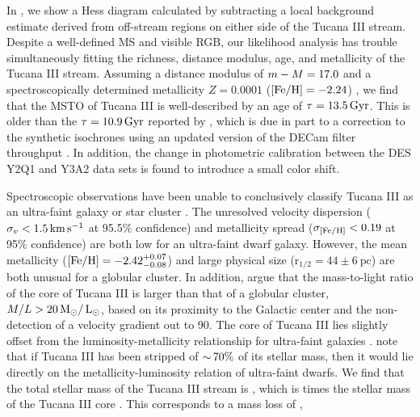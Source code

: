 \documentclass[twocolumn]{aastex61}
\begin{document}
In , we show a Hess diagram calculated by subtracting a local background estimate derived from off-stream regions on either side of the Tucana III stream.
Despite a well-defined MS and visible RGB, our likelihood analysis has trouble simultaneously fitting the richness, distance modulus, age, and metallicity of the Tucana III stream.
Assuming a distance modulus of $m - M = 17.0$ \citep{Drlica-Wagner:2015} and a spectroscopically determined metallicity  $Z = 0.0001$ (${\rm [Fe/H]} = -2.24$) \citep{Simon:2017}, we find that the MSTO of Tucana III is well-described by an age of ${\tau} = 13.5\mathrm{\,Gyr}$. 
This is older than the $\tau = 10.9\mathrm{\,Gyr}$ reported by \citet{Drlica-Wagner:2015}, which is due in part to a correction to the synthetic isochrones using an updated version of the DECam filter throughput \citep{Li:2018}.
In addition, the change in photometric calibration between the DES Y2Q1 and Y3A2 data sets is found to introduce a small color shift.

Spectroscopic observations have been unable to conclusively classify Tucana III as an ultra-faint galaxy or star cluster \citep{Simon:2017}. 
The unresolved velocity dispersion ($\sigma_v < 1.5 \mathrm{\,km} \mathrm{\,s}^{-1}$ at 95.5\% confidence) and metallicity spread ($\sigma_{{\rm [Fe/H]}} < 0.19$ at 95\% confidence) are both low for an ultra-faint dwarf galaxy. 
However, the mean metallicity (${\rm [Fe/H]} = -2.42^{+0.07}_{-0.08}$) and large physical size ($\mathrm{r_{1/2} = 44 \pm 6\ pc}$) are both unusual for a globular cluster. 
In addition, \citet{Simon:2017} argue that the mass-to-light ratio of the core of Tucana III is larger than that of a globular cluster, $M/L >20 \mathrm{\,M_\odot}/\mathrm{\,L_\odot}$, based on its proximity to the Galactic center and the non-detection of a velocity gradient out to 90\pc.
The core of Tucana III lies slightly offset from the luminosity-metallicity relationship for ultra-faint galaxies \citep{Kirby:2013}.
\citet{Simon:2017} note that if Tucana III has been stripped of $ {\sim}\, 70\%$ of its stellar mass, then it would lie directly on the metallicity-luminosity relation of ultra-faint dwarfs.
We find that the total stellar mass of the Tucana III stream is , which is  times the stellar mass of the Tucana III core \citep{Drlica-Wagner:2015}.
This corresponds to a mass loss of , 
\end{document}
